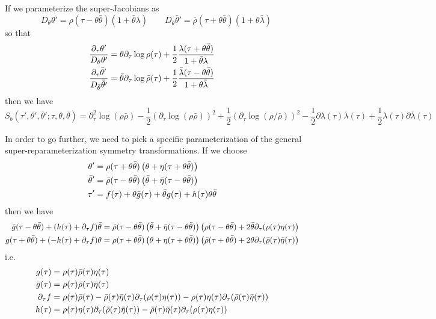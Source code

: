 \documentclass[aps,pre,preprint,onecolumn,citeautoscript,superscriptaddress,nofootinbib,eqsecnum]{revtex4-1}
\begin{document}
If we parameterize the super-Jacobians as 
\begin{equation}
D_\theta \theta' = \rho(\tau - \theta \bar \theta) (1 + \bar \theta \lambda) \qquad D_{\bar \theta} \bar \theta' = \bar \rho(\tau + \theta \bar \theta) (1 + \theta \bar \lambda)
\end{equation}
so that 
\begin{align}
\frac{\partial_\tau \theta'}{D_\theta \theta'} &= \theta \partial_\tau \log \rho(\tau) + \frac12 \frac{ \lambda(\tau +\theta \bar \theta)}{1 + \bar \theta \lambda} \cr
\frac{\partial_\tau \bar \theta'}{D_{\bar \theta} \bar \theta'} &=\bar \theta \partial_\tau \log \bar \rho(\tau) + \frac12 \frac{ \bar \lambda(\tau -\theta \bar \theta)}{1 + \theta \bar \lambda}
\end{align}
then we have 
\begin{equation}
S_b(\tau', \theta', \bar \theta';\tau, \theta, \bar \theta) =  \partial^2_\tau \log (\rho \bar \rho)
- \frac12( \partial_\tau \log (\rho\bar \rho))^2 +\frac12( \partial_\tau \log (\rho/\bar \rho))^2   -\frac12 \partial \lambda(\tau) \bar \lambda(\tau) + \frac12  \lambda(\tau) \partial \bar \lambda(\tau)\end{equation}

In order to go further, we need to pick a specific parameterization of the general super-reparameterization symmetry transformations. 
If we choose
\begin{align}
\theta' &= \rho(\tau + \theta \bar \theta) \left(\theta + \eta(\tau + \theta \bar \theta) \right) \cr
\bar \theta' &=\bar \rho(\tau - \theta \bar \theta) \left(\bar \theta + \bar \eta(\tau - \theta \bar \theta) \right) \cr
\tau' &= f(\tau) +  \theta \bar g(\tau) + \bar \theta g(\tau) + h(\tau) \theta \bar \theta
\end{align}
then we have 
\begin{align}
\bar g(\tau- \theta \bar \theta) + ( h(\tau)+ \partial_\tau f)  \bar \theta &= \bar \rho(\tau - \theta \bar \theta) \left(\bar \theta + \bar \eta(\tau - \theta \bar \theta) \right)  \left(  \rho(\tau- \theta \bar \theta)+ 2 \bar \theta \partial_\tau( \rho(\tau) \eta(\tau) \right) \cr
g(\tau+ \theta \bar \theta) + (- h(\tau)+ \partial_\tau f) \theta &= \rho(\tau +\theta \bar \theta) \left(\theta + \eta(\tau + \theta \bar \theta) \right)  \left(  \bar \rho(\tau+ \theta \bar \theta)+ 2  \theta \partial_\tau( \bar \rho(\tau) \bar \eta(\tau) \right)
\end{align}
i.e.
\begin{align}
g(\tau) &=  \rho(\tau) \bar \rho(\tau)\eta(\tau) \cr
\bar g(\tau) &=  \rho(\tau) \bar \rho(\tau)\bar \eta(\tau) \cr
\partial_\tau f &=\rho(\tau) \bar \rho(\tau) - \bar \rho(\tau) \bar \eta(\tau) \partial_\tau( \rho(\tau) \eta(\tau) ) -\rho(\tau) \eta(\tau) \partial_\tau( \bar \rho(\tau) \bar \eta(\tau) )\cr  
h(\tau)&=\rho(\tau) \eta(\tau) \partial_\tau( \bar \rho(\tau) \bar \eta(\tau) ) - \bar \rho(\tau) \bar \eta(\tau) \partial_\tau( \rho(\tau) \eta(\tau) ) 
\end{align}
\end{document}
